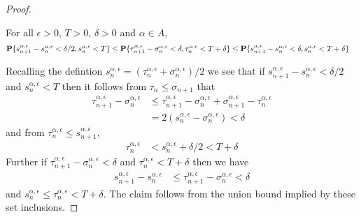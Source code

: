 \begin{proof}
\begin{clm} For all $\epsilon > 0$, $T > 0$, $\delta > 0$ and $\alpha \in A$,
\begin{align*}
\textbf{P}\{ s^{\alpha, \epsilon}_{n+1} - s^{\alpha, \epsilon}_n < \delta/2, s^{\alpha, \epsilon}_n < T \} 
&\leq \textbf{P}\{ \tau^{\alpha, \epsilon}_{n+1} - \sigma^{\alpha, \epsilon}_n < \delta, \tau^{\alpha, \epsilon}_n < T + \delta\} 
\leq \textbf{P}\{s^{\alpha, \epsilon}_{n+1} - s^{\alpha, \epsilon}_n < \delta, s^{\alpha, \epsilon}_n < T + \delta\} 
\end{align*}
\end{clm}

Recalling the defintion $s^{\alpha, \epsilon}_n = (\tau^{\alpha, \epsilon}_{n} + \sigma^{\alpha, \epsilon}_n)/2$ we see that if $s^{\alpha, \epsilon}_{n+1} - s^{\alpha, \epsilon}_n < \delta/2$ and $s^{\alpha, \epsilon}_n < T$ then it follows from $\tau_n \leq \sigma_{n+1}$ that 
\begin{align*}
\tau^{\alpha, \epsilon}_{n+1} - \sigma^{\alpha, \epsilon}_{n} &\leq  \tau^{\alpha, \epsilon}_{n+1} - \sigma^{\alpha, \epsilon}_{n} + \sigma^{\alpha, \epsilon}_{n+1} - \tau^{\alpha, \epsilon}_{n}  \\
&= 2 (s^{\alpha, \epsilon}_n  - \sigma^{\alpha, \epsilon}_n)  < \delta
\end{align*}
and from $\tau^{\alpha, \epsilon}_n \leq  s^{\alpha, \epsilon}_{n+1}$,
\begin{align*}
\tau^{\alpha, \epsilon}_n &< s^{\alpha, \epsilon}_{n} + \delta/2 < T + \delta
\end{align*}
Further if $\tau^{\alpha, \epsilon}_{n+1} - \sigma^{\alpha, \epsilon}_{n} < \delta$ and $\tau^{\alpha, \epsilon}_n < T + \delta$ then we have 
\begin{align*}
s^{\alpha, \epsilon}_{n+1} - s^{\alpha, \epsilon}_n &\leq \tau^{\alpha, \epsilon}_{n+1} - \sigma^{\alpha, \epsilon}_{n} < \delta
\end{align*}
and $ s^{\alpha, \epsilon}_n \leq  \tau^{\alpha, \epsilon}_n < T + \delta$.
The claim follows from the union bound implied by these set inclusions.


\end{proof}
